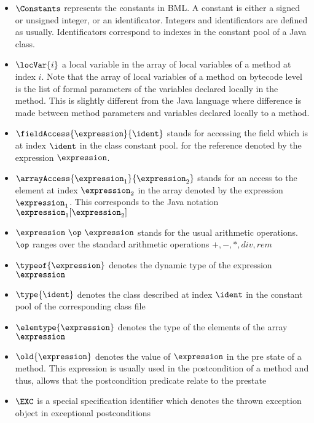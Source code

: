 \begin{itemize}
      \item  $ \Constants$ represents the constants in BML. 
             A constant is either a signed or unsigned integer, or an identificator.  
             Integers and identificators are defined as usually.  Identificators correspond 
	     to indexes in the constant pool of a Java class. 
      
      \item  $ \locVar{i}$ a local variable in the array of local variables of a method at index $i$. Note that the array of local variables of a method on bytecode level
             is the list of formal parameters of the variables declared locally in the method.
             This is slightly different from the Java language where difference is made between method parameters and variables declared locally to a method.	     
     
      \item  $\fieldAccess{ \expression}{\ident}$ stands for accessing the field which is at index $ \ident $  in the class constant pool.
             for the reference denoted by the expression
             $ \expression $. 
	     
	    

      \item  $\arrayAccess{\expression_1} {\expression_2} $ stands for an access to the element at index $ \expression_2$ 
             in the array denoted by the expression $ \expression_1$. This corresponds to the Java notation $\expression_1[\expression_2 ]  $ 

  

      \item  $\expression \ \op \ \expression$ stands for the usual arithmetic operations.
             $\op$ ranges over the standard  arithmetic operations $ + , - , * , div ,  rem $ 

      \item  $ \typeof{\expression}$  denotes the dynamic type of the expression $\expression$ 

      \item $ \type{ \ident } $  denotes the class  described at index $\ident$ in the constant pool of the corresponding class file
 
      \item $\elemtype{\expression}$ denotes the type of the elements of the array $\expression$

      \item $\old{\expression}$  denotes the value of $\expression$ in the pre state of a method. This expression is usually used in the postcondition of a
            method and thus, allows that the postcondition predicate relate to the prestate

      \item $\EXC$ is a special specification identifier which denotes the thrown exception object in exceptional postconditions
 \end{itemize}

